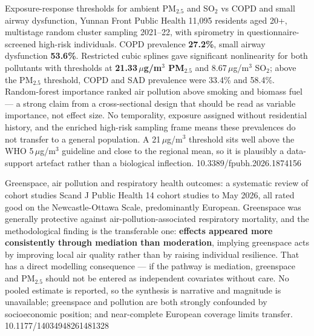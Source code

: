 \documentclass[10pt]{article}
\begin{document}
{Exposure-response thresholds for ambient PM$_{2.5}$ and SO$_2$ vs COPD and small airway dysfunction, Yunnan}
{Front Public Health}
{11{,}095 residents aged 20+, multistage random cluster sampling 2021--22, with spirometry
in questionnaire-screened high-risk individuals. COPD prevalence \textbf{27.2\%}, small
airway dysfunction \textbf{53.6\%}. Restricted cubic splines gave significant nonlinearity
for both pollutants with thresholds at \textbf{21.33\,$\mu$g/m$^3$ PM$_{2.5}$} and
8.67\,$\mu$g/m$^3$ SO$_2$; above the PM$_{2.5}$ threshold, COPD and SAD prevalence were
33.4\% and 58.4\%. Random-forest importance ranked air pollution above smoking and biomass
fuel --- a strong claim from a cross-sectional design that should be read as variable
importance, not effect size. No temporality, exposure assigned without residential history,
and the enriched high-risk sampling frame means these prevalences do not transfer to a
general population. A 21\,$\mu$g/m$^3$ threshold sits well above the WHO 5\,$\mu$g/m$^3$
guideline and close to the regional mean, so it is plausibly a data-support artefact
rather than a biological inflection.}
{10.3389/fpubh.2026.1874156}

{Greenspace, air pollution and respiratory health outcomes: a systematic review of cohort studies}
{Scand J Public Health}
{14 cohort studies to May 2026, all rated good on the Newcastle-Ottawa Scale,
predominantly European. Greenspace was generally protective against air-pollution-associated
respiratory mortality, and the methodological finding is the transferable one: \textbf{effects
appeared more consistently through mediation than moderation}, implying greenspace acts by
improving local air quality rather than by raising individual resilience. That has a direct
modelling consequence --- if the pathway is mediation, greenspace and PM$_{2.5}$ should not
be entered as independent covariates without care. No pooled estimate is reported, so the
synthesis is narrative and magnitude is unavailable; greenspace and pollution are both
strongly confounded by socioeconomic position; and near-complete European coverage limits
transfer.}
{10.1177/14034948261481328}


\end{document}
